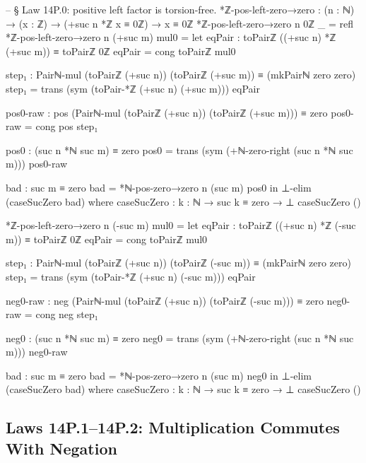 \documentclass[11pt,a4paper]{book}
\begin{document}
\begin{code}
-- § Law 14P.0: positive left factor is torsion-free.
*ℤ-pos-left-zero→zero : (n : ℕ) → (x : ℤ) → (+suc n *ℤ x ≡ 0ℤ) → x ≡ 0ℤ
*ℤ-pos-left-zero→zero n 0ℤ _ = refl
*ℤ-pos-left-zero→zero n (+suc m) mul0 =
  let
    eqPair : toPairℤ ((+suc n) *ℤ (+suc m)) ≡ toPairℤ 0ℤ
    eqPair = cong toPairℤ mul0

    step₁ : Pairℕ-mul (toPairℤ (+suc n)) (toPairℤ (+suc m)) ≡ (mkPairℕ zero zero)
    step₁ = trans (sym (toPair-*ℤ (+suc n) (+suc m))) eqPair

    pos0-raw : pos (Pairℕ-mul (toPairℤ (+suc n)) (toPairℤ (+suc m))) ≡ zero
    pos0-raw = cong pos step₁

    pos0 : (suc n *ℕ suc m) ≡ zero
    pos0 =
      trans
        (sym (+ℕ-zero-right (suc n *ℕ suc m)))
        pos0-raw

    bad : suc m ≡ zero
    bad = *ℕ-pos-zero→zero n (suc m) pos0
  in
  ⊥-elim (caseSucZero bad)
  where
    caseSucZero : {k : ℕ} → suc k ≡ zero → ⊥
    caseSucZero ()

*ℤ-pos-left-zero→zero n (-suc m) mul0 =
  let
    eqPair : toPairℤ ((+suc n) *ℤ (-suc m)) ≡ toPairℤ 0ℤ
    eqPair = cong toPairℤ mul0

    step₁ : Pairℕ-mul (toPairℤ (+suc n)) (toPairℤ (-suc m)) ≡ (mkPairℕ zero zero)
    step₁ = trans (sym (toPair-*ℤ (+suc n) (-suc m))) eqPair

    neg0-raw : neg (Pairℕ-mul (toPairℤ (+suc n)) (toPairℤ (-suc m))) ≡ zero
    neg0-raw = cong neg step₁

    neg0 : (suc n *ℕ suc m) ≡ zero
    neg0 =
      trans
        (sym (+ℕ-zero-right (suc n *ℕ suc m)))
        neg0-raw

    bad : suc m ≡ zero
    bad = *ℕ-pos-zero→zero n (suc m) neg0
  in
  ⊥-elim (caseSucZero bad)
  where
    caseSucZero : {k : ℕ} → suc k ≡ zero → ⊥
    caseSucZero ()
\end{code}

\subsection{Laws 14P.1--14P.2: Multiplication Commutes With Negation}
\end{document}
